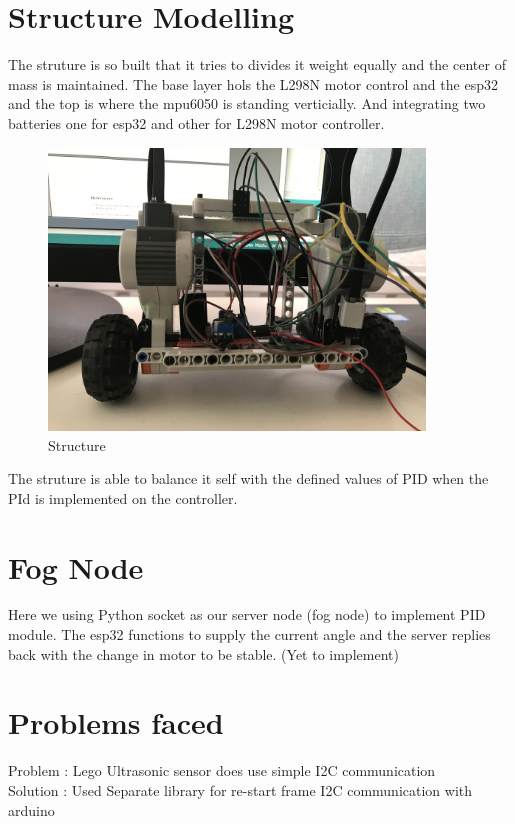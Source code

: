 \documentclass{article}
\begin{document}
  \section{Structure Modelling}
  The struture is so built that it tries to divides it weight equally and the center of mass is maintained. The base layer hols the L298N motor control and the esp32 and the top is where the mpu6050 is standing verticially. And integrating two batteries one for esp32 and other for L298N motor controller.
  
  	\begin{figure}[h]
 			\centering
 			\includegraphics[width=100mm,scale=0.5]{Structure}
 			\caption{Structure}
 			\label{Fig.6: Structure }
 		\end{figure}
 		
 	The struture is able to balance it self with the defined values of PID when the PId is implemented on the controller.
  
    
  \section{Fog Node}
  Here we using Python socket as our server node (fog node) to implement PID module. The esp32 functions to supply the current angle and the server replies back with the change in motor to be stable. 
  (Yet to implement)
  
  \pagebreak
  \section{Problems faced}
  Problem : Lego Ultrasonic sensor does use simple I2C communication\\
  Solution : Used Separate library for re-start frame I2C communication with arduino\\
  
\end{document}
